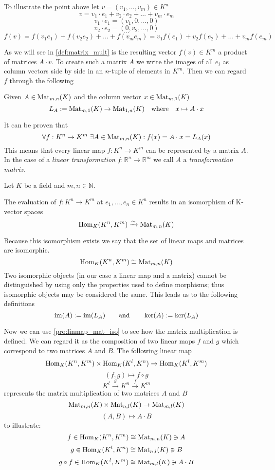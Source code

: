 To illustrate the point above let \(v = (v_1, \ldots, v_m) \in K^n\)
\[v = v_1 \cdot e_1 + v_2 \cdot e_2 + \ldots + v_m \cdot e_m\]
\[v_1 \cdot e_1 = (v_1, 0, \ldots, 0)\]
\[v_2 \cdot e_2 = (0, v_2, \ldots, 0)\]
\[\ldots\]
\[f(v) = f(v_1 e_1) + f(v_2 e_2) + \ldots + f(v_m e_m) = v_1 f(e_1) + v_2 f(e_2) + \ldots + v_m f(e_m)\]

As we will see in \cref{def:matrix_mult} is the resulting vector \(f(v) \in K^m\) a product of matrices \(A \cdot v\).
To create such a matrix \(A\) we write the images of all \(e_i\) as column vectors side by side in an \(n\)-tuple of elements in \(K^m\).
Then we can regard \(f\) through the following

\begin{definition}[\(L_A\)]\label{def:left_mat_mult}
   Given \(A \in \operatorname{Mat}_{m,n}(K)\) and the column vector \(x \in \operatorname{Mat}_{m,1}(K)\)
   \[L_{A} := \operatorname{Mat}_{m,1}(K) \to \operatorname{Mat}_{1,n}(K) \quad\text{where}\quad x \mapsto A \cdot x\]
\end{definition}
\begin{remark}
   It can be proven that
   \[\forall f: K^n \to K^m~\exists A \in \operatorname{Mat}_{m,n}(K): f(x) = A \cdot x = L_{A}(x)\]
   This means that every linear map \(f: K^n \to K^m\) can be represented by a matrix \(A\).
   In the case of a \textit{linear transformation} \(f: \mathbb{R}^n \to \mathbb{R}^m\) we call \(A\) a \textit{transformation matrix}.
\end{remark}

\begin{proposition}\label{pro:linmap_mat_iso}
   Let \(K\) be a field and \(m, n \in \mathbb{N}\).

   The evaluation of \(f: K^n \to K^m\) at \(e_1, \ldots, e_n \in K^n\) results in an isomorphism of K-vector spaces
   \[\operatorname{Hom}_K(K^n, K^m) \xrightarrow{\sim} \operatorname{Mat}_{m,n}(K)\]
\end{proposition}
\begin{remark}
   Because this isomorphism exists we say that the set of linear maps and matrices are isomorphic.
   \[\operatorname{Hom}_K(K^n, K^m) \cong \operatorname{Mat}_{m,n}(K)\]
   Two isomorphic objects (in our case a linear map and a matrix) cannot be distinguished by using only the properties used to define morphisms; thus isomorphic objects may be considered the same.
   This leads us to the following definitions
   \[\operatorname{im}(A) := \operatorname{im}(L_A) \qquad\text{and}\qquad \ker(A) := \ker(L_A)\]
\end{remark}

Now we can use \cref{pro:linmap_mat_iso} to see how the matrix multiplication is defined.
We can regard it as the composition of two linear maps \(f\) and \(g\) which correspond to two matrices \(A\) and \(B\).
The following linear map
\[\operatorname{Hom}_K(K^n, K^m) \times \operatorname{Hom}_K(K^l, K^n) \to \operatorname{Hom}_K(K^l, K^m)\]
\[(f, g) \mapsto f \circ g\]
\[K^l \xrightarrow{g} K^n \xrightarrow{f} K^m\]
represents the matrix multiplication of two matrices \(A\) and \(B\)
\[\operatorname{Mat}_{m,n}(K) \times \operatorname{Mat}_{n,l}(K) \to \operatorname{Mat}_{m,l}(K)\]
\[(A, B) \mapsto A \cdot B\]
to illustrate:
\[f \in \operatorname{Hom}_K(K^n, K^m) \cong \operatorname{Mat}_{m,n}(K) \ni A\]
\[g \in \operatorname{Hom}_K(K^l, K^n) \cong \operatorname{Mat}_{n,l}(K) \ni B\]
\[g \circ f \in \operatorname{Hom}_K(K^l, K^m) \cong \operatorname{Mat}_{m,l}(K) \ni A \cdot B\]


